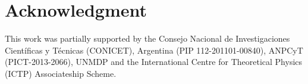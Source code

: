 \documentclass[a4paper]{elsart}
\begin{document}










\section*{Acknowledgment}
This work was partially supported by the Consejo Nacional de Investigaciones Científicas y Técnicas (CONICET), Argentina (PIP 112-201101-00840), ANPCyT (PICT-2013-2066), UNMDP and the International Centre for Theoretical Physics (ICTP) Associateship Scheme.



\end{document}
